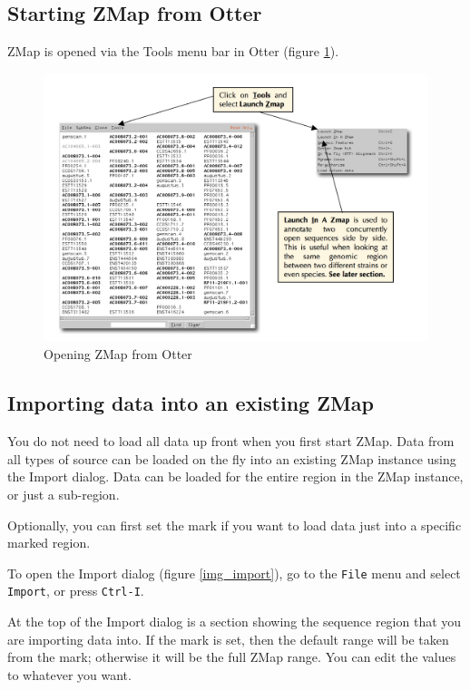 \documentclass[letterpaper]{article}
\begin{document}
\subsection{Starting ZMap from Otter}
ZMap is opened via the Tools menu bar in Otter (figure \ref{img_open_from_otterlace}).

\begin{figure}
\centering
\color[rgb]{0.30980393,0.5058824,0.7411765}
\includegraphics[width=15.231cm]{images/open_from_otterlace.png}
\caption{Opening ZMap from Otter}
\label{img_open_from_otterlace}
\end{figure}

\subsection{Importing data into an existing ZMap}
\label{sec_import}
You do not need to load all data up front when you first start ZMap. Data from all types of source can be loaded on the fly into an existing ZMap instance using the Import dialog. Data can be loaded for the entire region in the ZMap instance, or just a sub-region.

Optionally, you can first set the mark if you want to load data just into a specific marked region.

To open the Import dialog (figure \ref{img_import}), go to the \lstinline{File} menu and select \lstinline{Import}, or press \lstinline{Ctrl-I}.

At the top of the Import dialog is a section showing the sequence region that you are importing data into. If the mark is set, then the default range will be taken from the mark; otherwise it will be the full ZMap range. You can edit the values to whatever you want.
\end{document}
